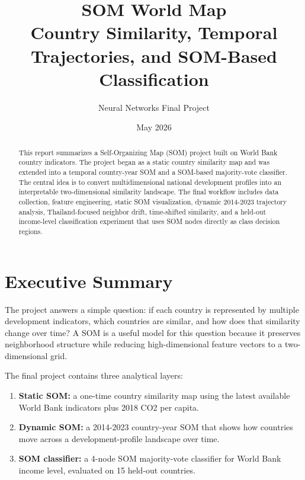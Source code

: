 \documentclass[11pt,a4paper]{article}
\title{
  \vspace{-1.0cm}
  \textbf{\Huge SOM World Map}\\
  \vspace{0.25cm}
  \Large Country Similarity, Temporal Trajectories, and SOM-Based Classification
}
\author{Neural Networks Final Project}
\date{May 2026}
\begin{document}
\maketitle

\begin{abstract}
This report summarizes a Self-Organizing Map (SOM) project built on World Bank country indicators. The project began as a static country similarity map and was extended into a temporal country-year SOM and a SOM-based majority-vote classifier. The central idea is to convert multidimensional national development profiles into an interpretable two-dimensional similarity landscape. The final workflow includes data collection, feature engineering, static SOM visualization, dynamic 2014-2023 trajectory analysis, Thailand-focused neighbor drift, time-shifted similarity, and a held-out income-level classification experiment that uses SOM nodes directly as class decision regions.
\end{abstract}

\setcounter{tocdepth}{1}
\tableofcontents
\newpage

\section{Executive Summary}

The project answers a simple question: if each country is represented by multiple development indicators, which countries are similar, and how does that similarity change over time? A SOM is a useful model for this question because it preserves neighborhood structure while reducing high-dimensional feature vectors to a two-dimensional grid.

The final project contains three analytical layers:

\begin{enumerate}
  \item \textbf{Static SOM:} a one-time country similarity map using the latest available World Bank indicators plus 2018 CO2 per capita.
  \item \textbf{Dynamic SOM:} a 2014-2023 country-year SOM that shows how countries move across a development-profile landscape over time.
  \item \textbf{SOM classifier:} a 4-node SOM majority-vote classifier for World Bank income level, evaluated on 15 held-out countries.
\end{enumerate}
\end{document}
